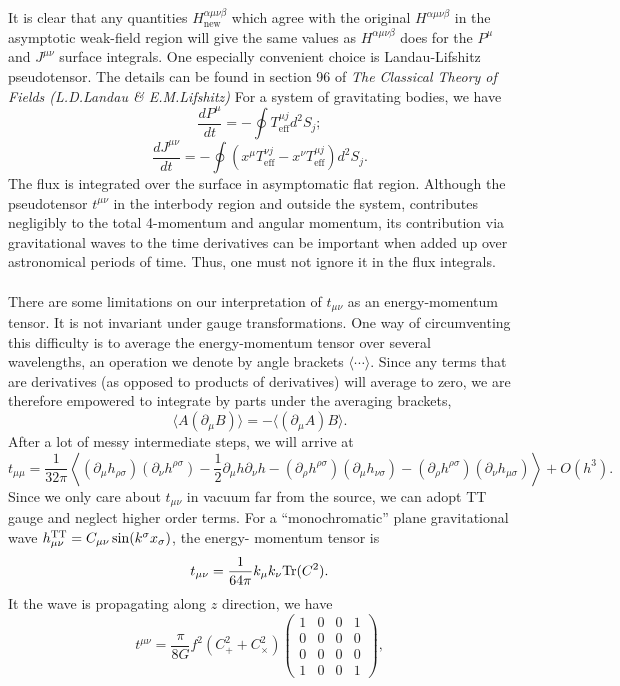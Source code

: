 \\ \\
It is clear that any quantities $H^{\alpha\mu\nu\beta}_{\mathrm{new}}$  which agree with the original $H^{\alpha\mu\nu\beta}$ in the asymptotic weak-field region will give the same values as $H^{\alpha\mu\nu\beta}$ does for the $P^{\mu}$ and $J^{\mu\nu}$ surface integrals. One especially convenient
choice is Landau-Lifshitz pseudotensor. The details can be found in section 96 of \emph{The Classical Theory of Fields (L.D.Landau \& E.M.Lifshitz)}
For a system of gravitating bodies, we have
\[\frac{dP^{\mu}}{dt} = -\oint T^{\mu j}_{\mathrm{eff}}d^2S_j ;\]
\[\frac{dJ^{\mu\nu}}{dt} = -\oint(x^{\mu}T^{\nu j}_{\mathrm{eff}} - x^{\nu}T^{\mu j}_{\mathrm{eff}}) d^2 S_j.\]
The flux is integrated over the surface in asymptomatic flat region. Although the pseudotensor $t^{\mu\nu}$ in the interbody region and outside the system, contributes negligibly to the total 4-momentum and angular momentum, its contribution via gravitational waves to the time derivatives can be important when added up over astronomical periods of time. Thus, one must not ignore it in the flux integrals.
\\ \\
There are some limitations on our interpretation of $t_{\mu\nu}$ as an energy-momentum tensor. 
It is not invariant  under gauge transformations. 
One way of circumventing this difficulty is to average the energy-momentum tensor over several wavelengths, an operation we denote by angle brackets $\langle \cdots \rangle$.
Since any terms that are derivatives (as opposed to products of derivatives) will average to zero, we are therefore empowered to integrate by parts under the averaging brackets,
\[\langle A(\partial_{\mu} B) \rangle = - \langle (\partial_{\mu} A)B \rangle.\]
After a lot of messy intermediate steps, we will arrive at
\[t_{\mu\mu} = \frac{1}{32\pi} \left\langle (\partial_{\mu}h_{\rho\sigma})(\partial_{\nu}h^{\rho\sigma}) - \frac{1}{2} \partial_{\mu} h \partial_{\nu} h - (\partial_{\rho}h^{\rho\sigma})(\partial_{\mu}h_{\nu\sigma}) - (\partial_{\rho}h^{\rho\sigma})(\partial_{\nu}h_{\mu\sigma})\right\rangle + O(h^3).\]
Since we only care about $t_{\mu\nu}$ in vacuum far from the source, we can adopt TT gauge and neglect higher order terms. 
For a ``monochromatic'' plane gravitational wave $h^{\rm TT}_{\mu\nu} = C_{\mu\nu} \sin(k^{\sigma}x_{\sigma})$, the energy- momentum tensor is
\[t_{\mu\nu} = \frac{1}{64\pi} k_{\mu}k_{\nu} {\rm Tr}(C^2).\]
It the wave is propagating along $z$ direction, we have
\[t^{\mu\nu} = \frac{\pi}{8G} f^2(C_{+}^2 + C_{\times}^2) \begin{pmatrix}
1 & 0 & 0 & 1 \\
0 & 0 & 0 & 0 \\
0 & 0 & 0 & 0 \\
1 & 0 & 0 & 1 
\end{pmatrix}, \]
